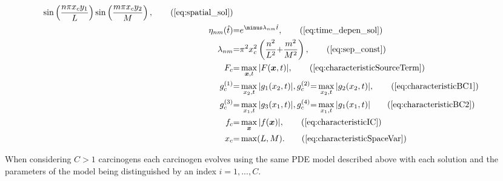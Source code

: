 \documentclass[\main/thesis.tex]{subfiles}
\begin{document}
\begin{align}
	                                                 \sin\left(\frac{n \pi x_c y_1}{L}\right)\sin\left(\frac{m \pi x_c y_2}{M}\right), \tag{\ref{eq:spatial_sol}}\\
\eta_{nm}(\hat{t}) &{=} e^{\minus \lambda_{nm} \hat{t}}, \tag{\ref{eq:time_depen_sol}}\\
\lambda_{nm} &{=} \pi^2 x_c^2 \left(\frac{n^2}{L^2} {+} \frac{m^2}{M^2}\right),
\tag{\ref{eq:sep_const}}\\
F_c &{=} \max_{\boldsymbol{x}, t} | F(\boldsymbol{x}, t) |,
\tag{\ref{eq:characteristicSourceTerm}}\\
g_c^{(1)} &{=} \max_{x_2, t} | g_1(x_2, t) |, g_c^{(2)} {=} \max_{x_2, t} | g_2(x_2, t) |,
\tag{\ref{eq:characteristicBC1}}\\
g_c^{(3)} &{=} \max_{x_1, t} | g_3(x_1, t) |, g_c^{(4)} {=} \max_{x_1, t} | g_1(x_1, t) |
\tag{\ref{eq:characteristicBC2}}\\
f_c &{=} \max_{\boldsymbol{x}} | f(\boldsymbol{x}) |,
\tag{\ref{eq:characteristicIC}}\\
x_c &{=} \max(L, M).
\tag{\ref{eq:characteristicSpaceVar}}
\end{align}

When considering $C {>} 1$ carcinogens each carcinogen evolves using the same PDE model described above with each solution and the parameters of the model being distinguished by an index $i {=} 1, ..., C$.
\end{document}
